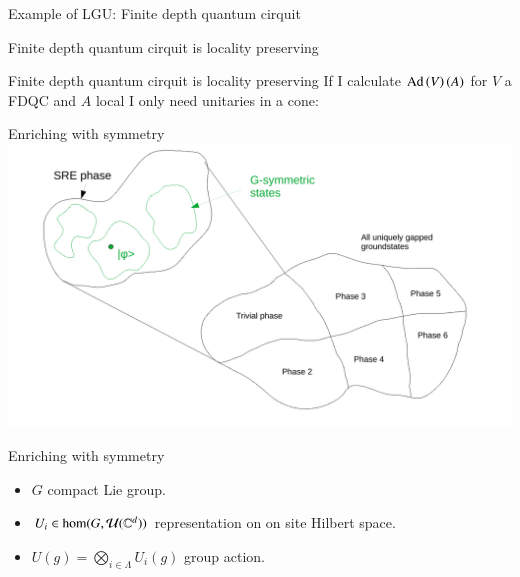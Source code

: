 \documentclass{beamer}
\begin{document}
\begin{frame}{Example of LGU: Finite depth quantum cirquit}
	\begin{center}
		
	\end{center}
\end{frame}

\begin{frame}{Finite depth quantum cirquit is locality preserving}
	\begin{center}
		\scalebox{0.75}{}
	\end{center}
	\pause
	\begin{center}
		\scalebox{0.75}{}
	\end{center}
\end{frame}

\begin{frame}{Finite depth quantum cirquit is locality preserving}
	If I calculate $\textrm{Ad}\left(V\right)(A)$ for $V$ a FDQC and $A$ local I only need unitaries in a cone:
	\begin{center}
		\scalebox{0.75}{
			
		}
	\end{center}
\end{frame}

\begin{frame}{Enriching with symmetry}
	\includegraphics[width=\textwidth]{Figures/G-invariant_Parts_Of_SRE_Phase.pdf}
\end{frame}

\begin{frame}{Enriching with symmetry}
	\begin{center}
		\scalebox{0.75}{
		
		}
	\end{center}
	\begin{itemize}
		\item $G$ compact Lie group.
		\item $U_i\in\hom(G,\mathcal{U}(\mathbb{C}^d))$ representation on on site Hilbert space.
		\item $U(g)=\bigotimes_{i\in\Lambda}U_i(g)$ group action.
	\end{itemize}
\end{frame}
\end{document}
